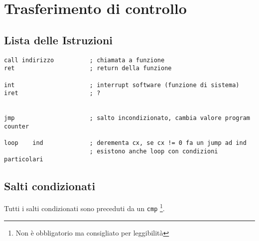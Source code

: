 \documentclass[../template]{subfiles}
\begin{document}
\section{Trasferimento di controllo}
\subsection{Lista delle Istruzioni}
\begin{lstlisting}
call indirizzo          ; chiamata a funzione
ret                     ; return della funzione

int                     ; interrupt software (funzione di sistema)
iret                    ; ?


jmp                     ; salto incondizionato, cambia valore program counter

loop    ind             ; derementa cx, se cx != 0 fa un jump ad ind
                        ; esistono anche loop con condizioni particolari
\end{lstlisting}
\subsection{Salti condizionati}
Tutti i salti condizionati sono preceduti da un \lstinline{cmp} \footnote{Non è obbligatorio ma consigliato per
leggibilità}.
\end{document}
